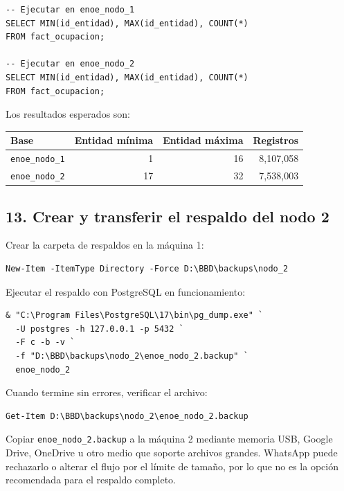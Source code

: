 \documentclass[12pt,letterpaper]{article}
\begin{document}
\begin{lstlisting}
-- Ejecutar en enoe_nodo_1
SELECT MIN(id_entidad), MAX(id_entidad), COUNT(*)
FROM fact_ocupacion;

-- Ejecutar en enoe_nodo_2
SELECT MIN(id_entidad), MAX(id_entidad), COUNT(*)
FROM fact_ocupacion;
\end{lstlisting}

Los resultados esperados son:

\begin{center}
\begin{tabular}{lrrr}
\toprule
\textbf{Base} & \textbf{Entidad mínima} & \textbf{Entidad máxima} &
\textbf{Registros} \\
\midrule
\texttt{enoe\_nodo\_1} & 1 & 16 & 8,107,058 \\
\texttt{enoe\_nodo\_2} & 17 & 32 & 7,538,003 \\
\bottomrule
\end{tabular}
\end{center}

\subsection{13. Crear y transferir el respaldo del nodo 2}

Crear la carpeta de respaldos en la máquina 1:

\begin{lstlisting}
New-Item -ItemType Directory -Force D:\BBD\backups\nodo_2
\end{lstlisting}

Ejecutar el respaldo con PostgreSQL en funcionamiento:

\begin{lstlisting}
& "C:\Program Files\PostgreSQL\17\bin\pg_dump.exe" `
  -U postgres -h 127.0.0.1 -p 5432 `
  -F c -b -v `
  -f "D:\BBD\backups\nodo_2\enoe_nodo_2.backup" `
  enoe_nodo_2
\end{lstlisting}

Cuando termine sin errores, verificar el archivo:

\begin{lstlisting}
Get-Item D:\BBD\backups\nodo_2\enoe_nodo_2.backup
\end{lstlisting}

Copiar \texttt{enoe\_nodo\_2.backup} a la máquina 2 mediante memoria USB,
Google Drive, OneDrive u otro medio que soporte archivos grandes. WhatsApp
puede rechazarlo o alterar el flujo por el límite de tamaño, por lo que no es
la opción recomendada para el respaldo completo.
\end{document}
